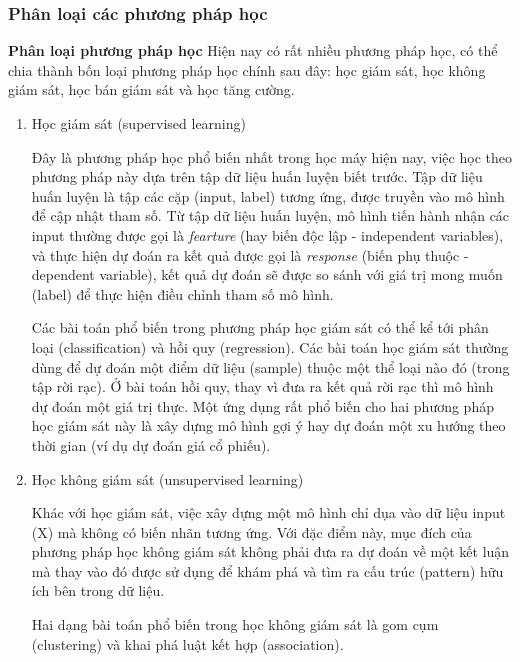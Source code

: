 
\subsubsection{Phân loại các phương pháp học}
\textbf{Phân loại phương pháp học}
Hiện nay có rất nhiều phương pháp học, có thể chia thành bốn loại phương pháp học chính sau đây: học giám sát, học không giám sát, học bán giám sát và học tăng cường.

\begin{enumerate}
    \item Học giám sát (supervised learning)

    Đây là phương pháp học phổ biến nhất trong học máy hiện nay, việc học theo phương pháp này dựa trên tập dữ liệu huấn luyện biết trước. Tập dữ liệu huấn luyện là tập các cặp (input, label) tương ứng, được truyền vào mô hình để cập nhật tham số. Từ tập dữ liệu huấn luyện, mô hình tiến hành nhận các input thường được gọi là \textit{fearture} (hay biến độc lập - independent variables), và thực hiện dự đoán ra kết quả được gọi là \textit{response} (biến phụ thuộc - dependent variable), kết quả dự đoán sẽ được so sánh với giá trị mong muốn (label) để thực hiện điều chỉnh tham số mô hình. 

    Các bài toán phổ biến trong phương pháp học giám sát có thể kể tới phân loại (classification) và hồi quy (regression). Các bài toán học giám sát thường dùng để dự đoán một điểm dữ liệu (sample) thuộc một thể loại nào đó (trong tập rời rạc). Ở bài toán hồi quy, thay vì đưa ra kết quả rời rạc thì mô hình dự đoán một giá trị thực. Một ứng dụng rất phổ biến cho hai phương pháp học giám sát này là xây dựng mô hình gợi ý hay dự đoán một xu hướng theo thời gian (ví dụ dự đoán giá cổ phiếu).

    \item Học không giám sát (unsupervised learning)
    
    Khác với học giám sát, việc xây dựng một mô hình chỉ dụa vào dữ liệu input (X) mà không có biến nhãn tương ứng. Với đặc điểm này, mục đích của phương pháp học không giám sát không phải đưa ra dự đoán về một kết luận mà thay vào đó được sử dụng để khám phá và tìm ra cấu trúc (pattern) hữu ích bên trong dữ liệu.

    Hai dạng bài toán phổ biến trong học không giám sát là gom cụm (clustering) và khai phá luật kết hợp (association). 
    

\end{enumerate}
